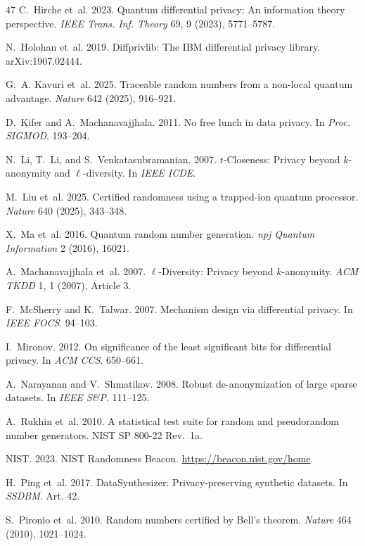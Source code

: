 \documentclass[acmsmall,screen,review,anonymous]{acmart}
\begin{document}
\begin{thebibliography}{47}
C.~Hirche et~al. 2023. Quantum differential privacy: An information theory perspective. \emph{IEEE Trans. Inf. Theory} 69, 9 (2023), 5771--5787.

N.~Holohan et~al. 2019. Diffprivlib: The IBM differential privacy library. arXiv:1907.02444.

G.~A. Kavuri et~al. 2025. Traceable random numbers from a non-local quantum advantage. \emph{Nature} 642 (2025), 916--921.

D.~Kifer and A.~Machanavajjhala. 2011. No free lunch in data privacy. In \emph{Proc. SIGMOD}. 193--204.

N.~Li, T.~Li, and S.~Venkatasubramanian. 2007. $t$-Closeness: Privacy beyond $k$-anonymity and $\ell$-diversity. In \emph{IEEE ICDE}.

M.~Liu et~al. 2025. Certified randomness using a trapped-ion quantum processor. \emph{Nature} 640 (2025), 343--348.

X.~Ma et~al. 2016. Quantum random number generation. \emph{npj Quantum Information} 2 (2016), 16021.

A.~Machanavajjhala et~al. 2007. $\ell$-Diversity: Privacy beyond $k$-anonymity. \emph{ACM TKDD} 1, 1 (2007), Article 3.

F.~McSherry and K.~Talwar. 2007. Mechanism design via differential privacy. In \emph{IEEE FOCS}. 94--103.

I.~Mironov. 2012. On significance of the least significant bits for differential privacy. In \emph{ACM CCS}. 650--661.

A.~Narayanan and V.~Shmatikov. 2008. Robust de-anonymization of large sparse datasets. In \emph{IEEE S\&P}. 111--125.

A.~Rukhin et~al. 2010. A statistical test suite for random and pseudorandom number generators. NIST SP 800-22 Rev.~1a.

{NIST}. 2023. NIST Randomness Beacon. \url{https://beacon.nist.gov/home}.

H.~Ping et~al. 2017. DataSynthesizer: Privacy-preserving synthetic datasets. In \emph{SSDBM}. Art. 42.

S.~Pironio et~al. 2010. Random numbers certified by Bell's theorem. \emph{Nature} 464 (2010), 1021--1024.


\end{thebibliography}
\end{document}
